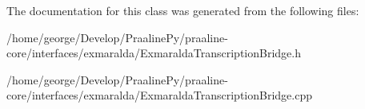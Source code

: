 The documentation for this class was generated from the following files\+:\begin{DoxyCompactItemize}
\item 
/home/george/\+Develop/\+Praaline\+Py/praaline-\/core/interfaces/exmaralda/Exmaralda\+Transcription\+Bridge.\+h\item 
/home/george/\+Develop/\+Praaline\+Py/praaline-\/core/interfaces/exmaralda/Exmaralda\+Transcription\+Bridge.\+cpp\end{DoxyCompactItemize}
